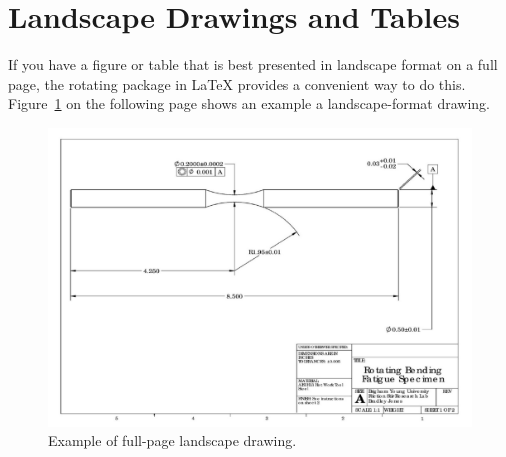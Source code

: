 \section{Landscape Drawings and Tables}
If you have a figure or table that is best presented in landscape format on a full page, the {\ttfamily rotating} package in \LaTeX{} provides a convenient way to do this. Figure~\ref{fig:landscape_dwg} on the following page shows an example a landscape-format drawing.
\begin{figure}
	\includegraphics[width=\textwidth]{figures/part_dwg_landscape.pdf}
	\caption{Example of full-page landscape drawing.}
	\label{fig:landscape_dwg}	
\end{figure}


